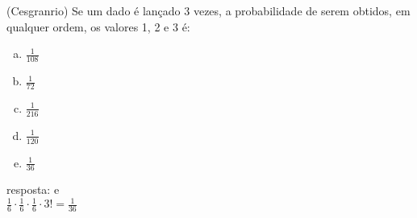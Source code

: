 \begin{ex}
 	(Cesgranrio) Se um dado é lançado 3 vezes, a probabilidade de serem obtidos, em qualquer ordem, os valores 1, 2 e 3 é:
    \begin{enumerate}[(a)]
    \item $\frac{1}{108}$
    \item $\frac{1}{72}$
    \item $\frac{1}{216}$
    \item $\frac{1}{120}$
    \item $\frac{1}{36}$
    \end{enumerate}
       \begin{sol}
         resposta: e \\
         $\frac{1}{6}\cdot\frac{1}{6}\cdot\frac{1}{6}\cdot3!=\frac{1}{36}$
       \end{sol}
\end{ex}